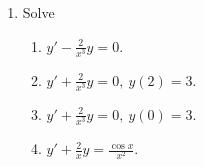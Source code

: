 \documentclass[a4paper,12pt,leqno]{article}
\begin{document}
\begin{enumerate}
\item
Solve

\begin{enumerate}


\item	$ \displaystyle   y' - \frac{2}{x^3} y = 0 $.

\item	$ \displaystyle   y' + \frac{2}{x^3} y = 0, \ y(2)=3 $.

\item	$ \displaystyle   y' + \frac{2}{x^3} y = 0, \ y(0)=3 $.	

\item	$ \displaystyle   y' + \frac{2}{x} y = \frac {\cos x} {x^{2}} $.
\end{enumerate}
\begin{comment}

\item   $ x^2 y'+ 3xy = \frac {\sin x} {x} $ .

\item   $ y' + \tan(x)y = x \sin(2x) $ .

\item   $ \displaystyle   t \frac{dy}{dt} + (t+1)y =t, \quad y(\ln 2 ) = 1 $ .

\item	$ y'-3x^2 y = -x^2 , \ \ y(0)=1 $ .
\end{enumerate}


\item
Solve  \
 $ \displaystyle   y' + \left( \frac {\ln^{2}x} {\sin^{2}x} \right) y = 0 , \ \  y(5) = 0 $ .






\item
Solve
\begin{enumerate}
\item	$ y'+ y^2 \, \sin x = 0 $.

\item	$ \displaystyle  y' = \frac{x^2} { y(1+x^3) } $.

\item	$ y' = 2(1+x) (1 + y^2) ,  \quad  y(0)=0 $.
\end{enumerate}









\item
Find all solutions of
\begin{enumerate}
\item	$ \displaystyle   y' = \frac {x+2y} {x} $ ,


\end{comment}
\end{enumerate}
\end{document}
